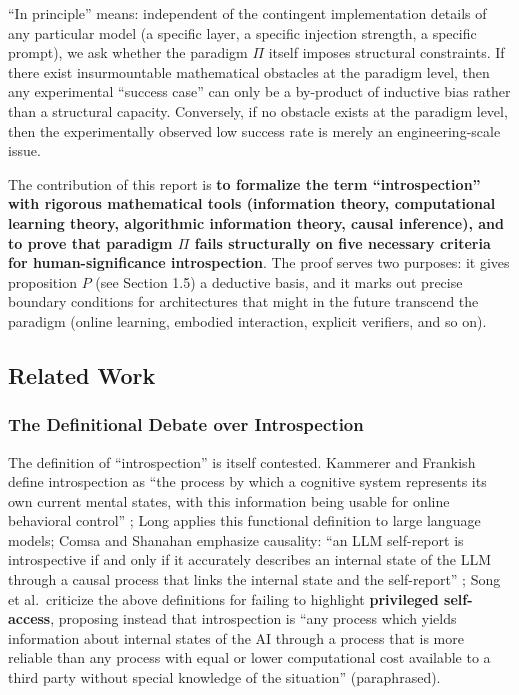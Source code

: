 ``In principle'' means: independent of the contingent implementation details of any particular
model (a specific layer, a specific injection strength, a specific prompt), we ask whether the
paradigm $\Pi$ itself imposes structural constraints. If there exist insurmountable
mathematical obstacles at the paradigm level, then any experimental ``success case'' can only be
a by-product of inductive bias rather than a structural capacity. Conversely, if no obstacle
exists at the paradigm level, then the experimentally observed low success rate is merely an
engineering-scale issue.

The contribution of this report is \textbf{to formalize the term ``introspection'' with
rigorous mathematical tools (information theory, computational learning theory, algorithmic
information theory, causal inference), and to prove that paradigm $\Pi$ fails structurally on
five necessary criteria for human-significance introspection}. The proof serves two purposes:
it gives proposition $P$ (see Section 1.5) a deductive basis, and it marks out precise
boundary conditions for architectures that might in the future transcend the paradigm
(online learning, embodied interaction, explicit verifiers, and so on).

\subsection{Related Work}

\subsubsection{The Definitional Debate over Introspection}

The definition of ``introspection'' is itself contested. Kammerer and Frankish
define introspection as ``the process by which a cognitive system represents its own current
mental states, with this information being usable for online behavioral control''
\cite{kammerer-frankish-2023}; Long applies this functional definition to large language
models\cite{long-2023-introspection}; Comsa and Shanahan emphasize causality: ``an LLM
self-report is introspective if and only if it accurately describes an internal state of the
LLM through a causal process that links the internal state and the self-report''
\cite{comsa-shanahan-2025}; Song et al.\ criticize the above definitions for failing to
highlight \textbf{privileged self-access}, proposing instead that introspection is ``any process
which yields information about internal states of the AI through a process that is more
reliable than any process with equal or lower computational cost available to a third party
without special knowledge of the situation'' (paraphrased)\cite{song-privileged-2025}.

